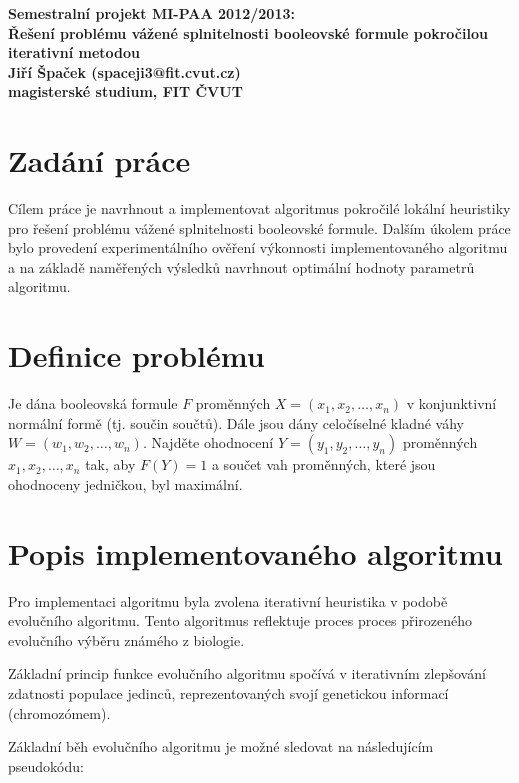 \documentclass[12pt,oneside,a4paper]{article}
\begin{document}
\begin{center}
\bf Semestralní projekt MI-PAA 2012/2013:\\[5mm]
     Řešení problému vážené splnitelnosti booleovské formule pokročilou iterativní metodou\\[5mm]
       Jiří Špaček (spaceji3@fit.cvut.cz)\\[2mm]
magisterské studium, FIT ČVUT\\[2mm]
\end{center}

\section{Zadání práce}

Cílem práce je navrhnout a implementovat algoritmus pokročilé lokální heuristiky pro řešení problému vážené  splnitelnosti booleovské formule. Dalším úkolem práce bylo provedení experimentálního ověření výkonnosti implementovaného algoritmu a na základě naměřených výsledků navrhnout optimální hodnoty parametrů algoritmu.

\section{Definice problému}

Je dána booleovská formule $F$ proměnných $X=(x_1, x_2, … , x_n)$ v konjunktivní normální formě (tj. součin součtů). Dále jsou dány celočíselné kladné váhy $W=(w_1, w_2, … , w_n)$. Najděte ohodnocení $Y=(y_1, y_2, … , y_n)$ proměnných $x_1, x_2, … , x_n$ tak, aby $F(Y)=1$ a součet vah proměnných, které jsou ohodnoceny jedničkou, byl maximální. 

\section{Popis implementovaného algoritmu}

Pro implementaci algoritmu byla zvolena iterativní heuristika v podobě evolučního algoritmu. Tento algoritmus reflektuje proces proces přirozeného evolučního výběru známého z biologie.

Základní princip funkce evolučního algoritmu spočívá v iterativním zlepšování zdatnosti populace jedinců, reprezentovaných svojí genetickou informací (chromozómem).


Základní běh evolučního algoritmu je možné sledovat na následujícím pseudokódu:
\end{document}
